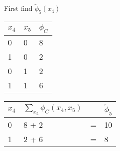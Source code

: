 \begin{exenumerate}
\begin{solution}
    First find $\tilde{\phi}_5(x_4)$
    \begin{center}
      \begin{tabular}{lll}
        \toprule
        $x_4$ & $x_5$ & $\phi_C$\\
        \midrule
        0 & 0 & 8 \\
        1 & 0 & 2 \\
        0 & 1 & 2 \\
        1 & 1 & 6 \\
        \bottomrule
      \end{tabular}
      \hspace{3ex}  \hspace{3ex}
      \begin{tabular}{llll}
        \toprule
        $x_4$ & $\sum_{x_5} \phi_C(x_4, x_5)$ &  & $\tilde{\phi}_5$\\
        \midrule
        0 & 8 + 2 & = & 10 \\
        1 & 2 + 6 & = & 8 \\
        \bottomrule
      \end{tabular}
    \end{center}


\end{solution}
\end{exenumerate}
